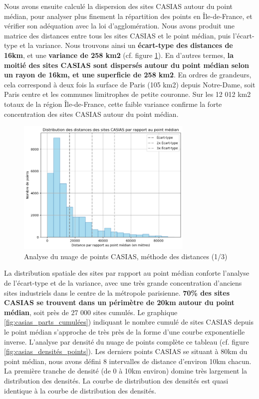 \documentclass[a4paper,twoside,12pt]{book}
\begin{document}
Nous avons ensuite calculé la dispersion des sites CASIAS autour du point médian, pour analyser plus finement la répartition des points en Île-de-France, et vérifier son adéquation avec la loi d'agglomération. Nous avons produit une matrice des distances entre tous les sites CASIAS et le point médian, puis l'écart-type et la variance. Nous trouvons ainsi un \textbf{écart-type des distances de 16km}, et une \textbf{variance de 258 km2} (cf. figure \ref{fig:dist_casias_pointmedian_1}). En d'autres termes, \textbf{la moitié des sites CASIAS sont dispersés autour du point médian selon un rayon de 16km, et une superficie de 258 km2}. En ordres de grandeurs, cela correspond à deux fois la surface de Paris (105 km2) depuis Notre-Dame, soit Paris centre et les communes limitrophes de petite couronne. Sur les 12 012 km2 totaux de la région Île-de-France, cette faible variance confirme la forte concentration des sites CASIAS autour du point médian. 

 \begin{figure}[!h] 
\centering  
\includegraphics[width=0.75\textwidth]{img/chapitre3/CASIAS_Dispersion_Points_Centraux_1.png} 
\caption{Analyse du nuage de points CASIAS, méthode des distances (1/3)} 
\label{fig:dist_casias_pointmedian_1} 
\end{figure}

La distribution spatiale des sites par rapport au point médian conforte l'analyse de l'écart-type et de la variance, avec une très grande concentration d'anciens sites industriels dans le centre de la métropole parisienne. \textbf{70\% des sites CASIAS se trouvent dans un périmètre de 20km autour du point médian}, soit près de 27 000 sites cumulés. Le graphique \ref{fig:casias_parts_cumulées}) indiquant le nombre cumulé de sites CASIAS depuis le point médian s'approche de très près de la forme d'une courbe exponentielle inverse.  L'analyse par densité du nuage de points complète ce tableau (cf. figure \ref{fig:casias_densités_points}). Les derniers points CASIAS se situant à 80km du point médian, nous avons défini 8 intervalles de distance d'environ 10km chacun. La première tranche de densité (de 0 à 10km environ) domine très largement la distribution des densités. La courbe de distribution des densités est quasi identique à la courbe de distribution des densités.  
\end{document}
